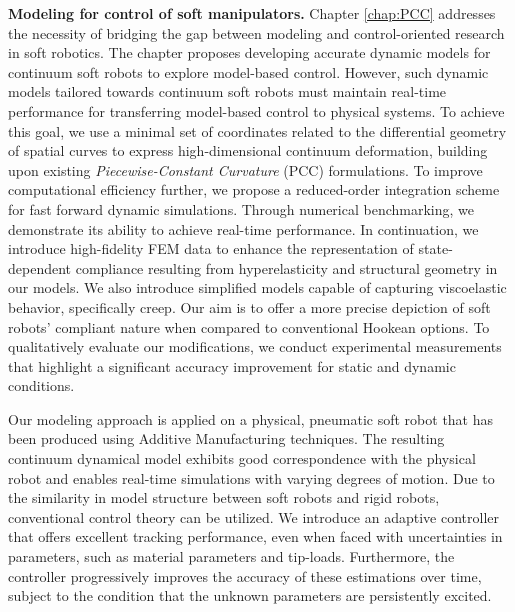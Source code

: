 \textbf{Modeling for control of soft manipulators.} Chapter \ref{chap:PCC} addresses the necessity of bridging the gap between modeling and control-oriented research in soft robotics. The chapter proposes developing accurate dynamic models for continuum soft robots to explore model-based control. However, such dynamic models tailored towards continuum soft robots must maintain real-time performance for transferring model-based control to physical systems. To achieve this goal, we use a minimal set of coordinates related to the differential geometry of spatial curves to express high-dimensional continuum deformation, building upon existing \textit{Piecewise-Constant Curvature} (PCC) formulations. To improve computational efficiency further, we propose a reduced-order integration scheme for fast forward dynamic simulations. Through numerical benchmarking, we demonstrate its ability to achieve real-time performance. In continuation, we introduce high-fidelity FEM data to enhance the representation of state-dependent compliance resulting from hyperelasticity and structural geometry in our models. We also introduce simplified models capable of capturing viscoelastic behavior, specifically creep. Our aim is to offer a more precise depiction of soft robots' compliant nature when compared to conventional Hookean options. To qualitatively evaluate our modifications, we conduct experimental measurements that highlight a significant accuracy improvement for static and dynamic conditions.

Our modeling approach is applied on a physical, pneumatic soft robot that has been produced using Additive Manufacturing techniques. The resulting continuum dynamical model exhibits good correspondence with the physical robot and enables real-time simulations with varying degrees of motion. Due to the similarity in model structure between soft robots and rigid robots, conventional control theory can be utilized. We introduce an adaptive controller that offers excellent tracking performance, even when faced with uncertainties in parameters, such as material parameters and tip-loads. Furthermore, the controller progressively improves the accuracy of these estimations over time, subject to the condition that the unknown parameters are persistently excited.

